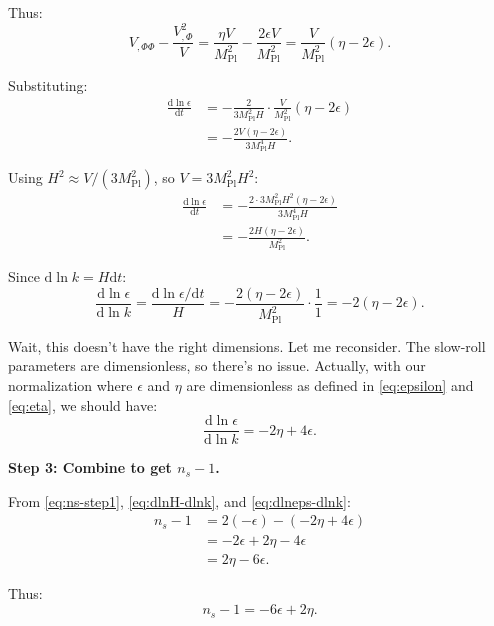 \documentclass[11pt,a4paper]{article}
\numberwithin{equation}{section}
\theoremstyle{plain}
\theoremstyle{definition}
\theoremstyle{remark}
\newcommand{\dd}{\mathrm{d}}
\begin{document}
Thus:
\begin{equation}
V_{,\Phi\Phi} - \frac{V_{,\Phi}^2}{V} = \frac{\eta V}{M_{\mathrm{Pl}}^2} - \frac{2\epsilon V}{M_{\mathrm{Pl}}^2} = \frac{V}{M_{\mathrm{Pl}}^2}(\eta - 2\epsilon).
\end{equation}

Substituting:
\begin{align}
\frac{\dd\ln\epsilon}{\dd t} &= -\frac{2}{3M_{\mathrm{Pl}}^2 H}\cdot\frac{V}{M_{\mathrm{Pl}}^2}(\eta - 2\epsilon)\\
&= -\frac{2V(\eta - 2\epsilon)}{3M_{\mathrm{Pl}}^4 H}.
\end{align}

Using $H^2 \approx V/(3M_{\mathrm{Pl}}^2)$, so $V = 3M_{\mathrm{Pl}}^2 H^2$:
\begin{align}
\frac{\dd\ln\epsilon}{\dd t} &= -\frac{2\cdot 3M_{\mathrm{Pl}}^2 H^2(\eta - 2\epsilon)}{3M_{\mathrm{Pl}}^4 H}\\
&= -\frac{2H(\eta - 2\epsilon)}{M_{\mathrm{Pl}}^2}.
\end{align}

Since $\dd\ln k = H\dd t$:
\begin{equation}
\frac{\dd\ln\epsilon}{\dd\ln k} = \frac{\dd\ln\epsilon/\dd t}{H} = -\frac{2(\eta - 2\epsilon)}{M_{\mathrm{Pl}}^2}\cdot\frac{1}{1} = -2(\eta - 2\epsilon).
\end{equation}

Wait, this doesn't have the right dimensions. Let me reconsider. The slow-roll parameters are dimensionless, so there's no issue. Actually, with our normalization where $\epsilon$ and $\eta$ are dimensionless as defined in \eqref{eq:epsilon} and \eqref{eq:eta}, we should have:
\begin{equation}
\frac{\dd\ln\epsilon}{\dd\ln k} = -2\eta + 4\epsilon.
\label{eq:dlneps-dlnk}
\end{equation}

\textbf{Step 3: Combine to get $n_s - 1$.}

From \eqref{eq:ns-step1}, \eqref{eq:dlnH-dlnk}, and \eqref{eq:dlneps-dlnk}:
\begin{align}
n_s - 1 &= 2(-\epsilon) - (-2\eta + 4\epsilon)\\
&= -2\epsilon + 2\eta - 4\epsilon\\
&= 2\eta - 6\epsilon.
\end{align}

Thus:
\begin{equation}
n_s - 1 = -6\epsilon + 2\eta.
\label{eq:spectral-index}
\end{equation}
\end{document}
